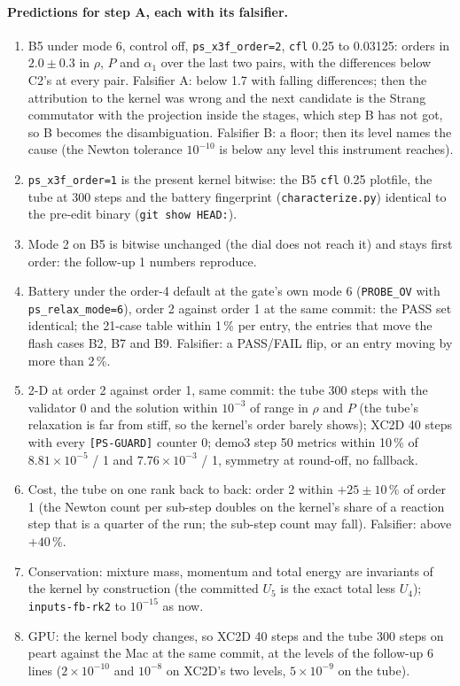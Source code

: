 \documentclass[11pt,a4paper]{article}
\newcommand{\code}[1]{\texttt{\small #1}}
\begin{document}
\paragraph{Predictions for step A, each with its falsifier.}
\begin{enumerate}[nosep]
\item B5 under mode 6, control off, \code{ps\_x3f\_order=2},
      \code{cfl} 0.25 to 0.03125: orders in $2.0\pm0.3$ in $\rho$, $P$
      and $\alpha_1$ over the last two pairs, with the differences below
      C2's at every pair.  Falsifier A: below 1.7 with falling
      differences; then the attribution to the kernel was wrong and the
      next candidate is the Strang commutator with the projection inside
      the stages, which step B has not got, so B becomes the
      disambiguation.  Falsifier B: a floor; then its level names the
      cause (the Newton tolerance $10^{-10}$ is below any level this
      instrument reaches).
\item \code{ps\_x3f\_order=1} is the present kernel bitwise: the B5
      \code{cfl} 0.25 plotfile, the tube at 300 steps and the battery
      fingerprint (\code{characterize.py}) identical to the pre-edit
      binary (\code{git show HEAD:}).
\item Mode 2 on B5 is bitwise unchanged (the dial does not reach it) and
      stays first order: the follow-up 1 numbers reproduce.
\item Battery under the order-4 default at the gate's own mode 6
      (\code{PROBE\_OV} with \code{ps\_relax\_mode=6}), order 2 against
      order 1 at the same commit: the PASS set identical; the 21-case
      table within 1\,\% per entry, the entries that move the flash
      cases B2, B7 and B9.  Falsifier: a PASS/FAIL flip, or an entry
      moving by more than 2\,\%.
\item 2-D at order 2 against order 1, same commit: the tube 300 steps
      with the validator 0 and the solution within $10^{-3}$ of range in
      $\rho$ and $P$ (the tube's relaxation is far from stiff, so the
      kernel's order barely shows); XC2D 40 steps with every
      \code{[PS-GUARD]} counter 0; demo3 step 50 metrics within 10\,\% of
      $8.81\times10^{-5}$ / 1 and $7.76\times10^{-3}$ / 1, symmetry at
      round-off, no fallback.
\item Cost, the tube on one rank back to back: order 2 within $+25\pm10$\,\%
      of order 1 (the Newton count per sub-step doubles on the kernel's
      share of a reaction step that is a quarter of the run; the
      sub-step count may fall).  Falsifier: above $+40\,\%$.
\item Conservation: mixture mass, momentum and total energy are
      invariants of the kernel by construction (the committed $U_5$ is
      the exact total less $U_4$); \code{inputs-fb-rk2} to $10^{-15}$
      as now.
\item GPU: the kernel body changes, so XC2D 40 steps and the tube 300
      steps on peart against the Mac at the same commit, at the levels
      of the follow-up 6 lines ($2\times10^{-10}$ and $10^{-8}$ on
      XC2D's two levels, $5\times10^{-9}$ on the tube).
\end{enumerate}
\end{document}
